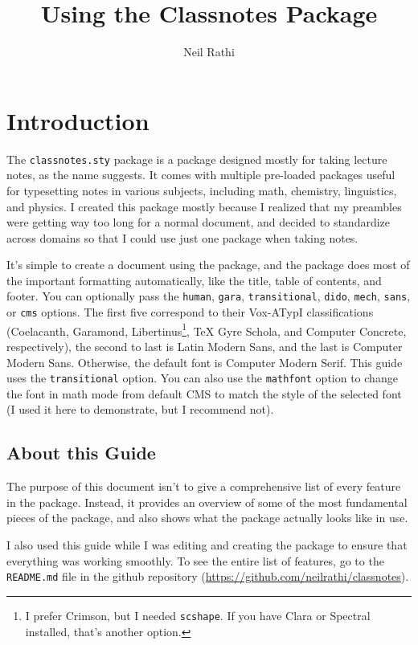 \documentclass[11pt]{article}
\title{Using the Classnotes Package}
\author{Neil Rathi}
\begin{document}
\thispagestyle{empty}

\maketitle

\tableofcontents

\newpage

\section{Introduction}
The \texttt{classnotes.sty} package is a package designed mostly for taking lecture notes, as the name suggests. It comes with multiple pre-loaded packages useful for typesetting notes in various subjects, including math, chemistry, linguistics, and physics. I created this package mostly because I realized that my preambles were getting way too long for a normal document, and decided to standardize across domains so that I could use just one package when taking notes.

It's simple to create a document using the package, and the package does most of the important formatting automatically, like the title, table of contents, and footer. You can optionally pass the \texttt{human}, \texttt{gara}, \texttt{transitional}, \texttt{dido}, \texttt{mech}, \texttt{sans}, or \texttt{cms} options. The first five correspond to their Vox-ATypI classifications (Coelacanth, Garamond, Libertinus\footnote{I prefer Crimson, but I needed \texttt{scshape}. If you have Clara or Spectral installed, that's another option.}, \TeX{} Gyre Schola, and Computer Concrete, respectively), the second to last is Latin Modern Sans, and the last is Computer Modern Sans. Otherwise, the default font is Computer Modern Serif. This guide uses the \verb|transitional| option. You can also use the \verb|mathfont| option to change the font in math mode from default CMS to match the style of the selected font (I used it here to demonstrate, but I recommend not).

\subsection{About this Guide}
The purpose of this document isn't to give a comprehensive list of every feature in the package. Instead, it provides an overview of some of the most fundamental pieces of the package, and also shows what the package actually looks like in use.

I also used this guide while I was editing and creating the package to ensure that everything was working smoothly. To see the entire list of features, go to the \texttt{README.md} file in the github repository (\url{https://github.com/neilrathi/classnotes}).
\end{document}
